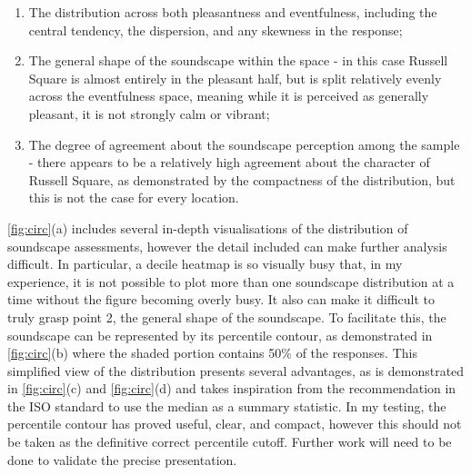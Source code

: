 \begin{enumerate}
  \item The distribution across both pleasantness and eventfulness, including the central tendency, the dispersion, and any skewness in the response;
  \item The general shape of the soundscape within the space - in this case Russell Square is almost entirely in the pleasant half, but is split relatively evenly across the eventfulness space, meaning while it is perceived as generally pleasant, it is not strongly calm or vibrant;
  \item The degree of agreement about the soundscape perception among the sample - there appears to be a relatively high agreement about the character of Russell Square, as demonstrated by the compactness of the distribution, but this is not the case for every location.
\end{enumerate}

\cref{fig:circ}(a) includes several in-depth visualisations of the distribution of soundscape assessments, however the detail included can make further analysis difficult. In particular, a decile heatmap is so visually busy that, in my experience, it is not possible to plot more than one soundscape distribution at a time without the figure becoming overly busy. It also can make it difficult to truly grasp point 2, the general shape of the soundscape. To facilitate this, the soundscape can be represented by its  percentile contour, as demonstrated in \cref{fig:circ}(b) where the shaded portion contains 50\% of the responses. This simplified view of the distribution presents several advantages, as is demonstrated in \cref{fig:circ}(c) and \cref{fig:circ}(d) and takes inspiration from the recommendation in the ISO standard to use the median as a summary statistic. In my testing, the  percentile contour has proved useful, clear, and compact, however this should not be taken as the definitive correct percentile cutoff. Further work will need to be done to validate the precise presentation.

